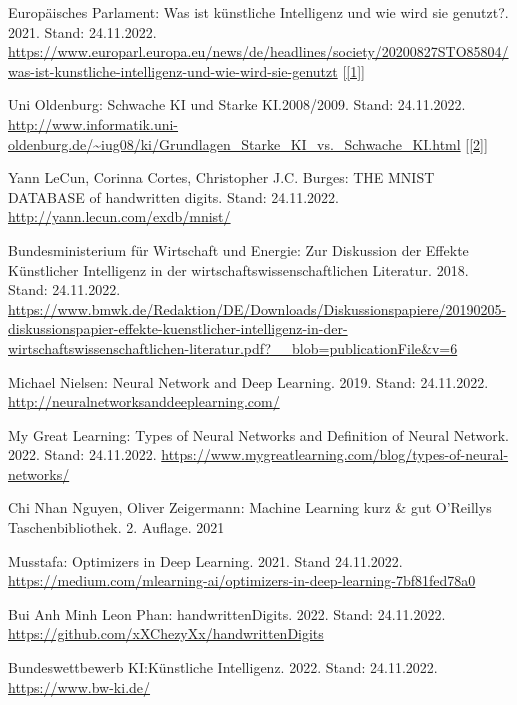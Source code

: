 \documentclass[11pt]{article}
\begin{document}
\newpage
\nolinenumbers{}
{%
\renewcommand\refname{Literaturverzeichnis}
\hypersetup{linkcolor=red}
\renewcommand\UrlFont{\color{black}\normalfont}
\begin{thebibliography}{15}

    Europäisches Parlament: Was ist künstliche Intelligenz und wie wird sie genutzt?. 2021. Stand: 24.11.2022.
    \url{https://www.europarl.europa.eu/news/de/headlines/society/20200827STO85804/was-ist-kunstliche-intelligenz-und-wie-wird-sie-genutzt}
    [\ref{1}]
    
    Uni Oldenburg: Schwache KI und Starke KI.\@ 2008/2009. Stand: 24.11.2022.
    \url{http://www.informatik.uni-oldenburg.de/~iug08/ki/Grundlagen_Starke_KI_vs._Schwache_KI.html}
    [\ref{2}]

    Yann LeCun, Corinna Cortes, Christopher J.C. Burges: THE MNIST DATABASE of handwritten digits. Stand: 24.11.2022.
    \url{http://yann.lecun.com/exdb/mnist/}

    Bundesministerium für Wirtschaft und Energie: Zur Diskussion der Effekte Künstlicher Intelligenz in der wirtschaftswissenschaftlichen Literatur. 2018. Stand: 24.11.2022.
    \url{https://www.bmwk.de/Redaktion/DE/Downloads/Diskussionspapiere/20190205-diskussionspapier-effekte-kuenstlicher-intelligenz-in-der-wirtschaftswissenschaftlichen-literatur.pdf?__blob=publicationFile&v=6}

    Michael Nielsen: Neural Network and Deep Learning. 2019. Stand: 24.11.2022.
    \url{http://neuralnetworksanddeeplearning.com/}

    My Great Learning: Types of Neural Networks and Definition of Neural Network. 2022. Stand: 24.11.2022.
    \url{https://www.mygreatlearning.com/blog/types-of-neural-networks/}

    Chi Nhan Nguyen, Oliver Zeigermann: Machine Learning kurz \& gut O’Reillys Taschenbibliothek. 2. Auflage. 2021

    Musstafa: Optimizers in Deep Learning. 2021. Stand 24.11.2022.
    \url{https://medium.com/mlearning-ai/optimizers-in-deep-learning-7bf81fed78a0}

    Bui Anh Minh Leon Phan: handwrittenDigits. 2022. Stand: 24.11.2022.
    \url{https://github.com/xXChezyXx/handwrittenDigits}

    Bundeswettbewerb KI:\@ Künstliche Intelligenz. 2022. Stand: 24.11.2022.
    \url{https://www.bw-ki.de/}

\end{thebibliography}
}
\newpage
\end{document}
